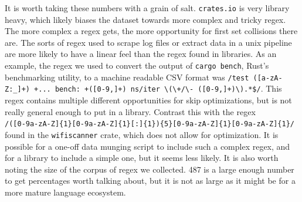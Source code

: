 It is worth taking these numbers with a grain of salt. \verb'crates.io'
is very library heavy, which likely biases the dataset towards
more complex and tricky regex. The more complex a regex gets,
the more opportunity for first set collisions there are. The sorts
of regex used to scrape log files or extract data in a unix pipeline
are more likely to have a linear feel than the regex found in
libraries. As an example, the regex we used to convert the output
of \verb'cargo bench', Rust's benchmarking utility, to a machine
readable CSV format was
\verb'/test ([a-zA-Z:_]+) +... bench: +([0-9,]+) ns/iter \(\+/\- ([0-9,]+)\).*$/'.
This regex contains multiple different opportunities for skip optimizations,
but is not really general enough to put in a library. Contrast this
with the regex \\
 \verb'/([0-9a-zA-Z]{1}[0-9a-zA-Z]{1}[:]{1}){5}[0-9a-zA-Z]{1}[0-9a-zA-Z]{1}/'
found in the \verb'wifiscanner' crate, which does not allow for
optimization. It is possible for a one-off data munging script to include
such a complex regex, and for a library to include a simple one, but
it seems less likely. It is also worth noting the size of the corpus of
regex we collected. 487 is a large enough number to get 
percentages worth talking about, but it is not as large as it might
be for a more mature language ecosystem.

